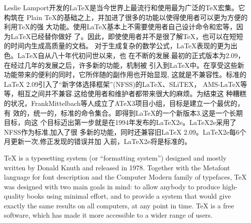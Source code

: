 \documentclass[UTF8,nofonts]{ctexart}
\begin{document}
Leslie Lamport开发的LaTeX是当今世界上最流行和使用最为广泛的TeX宏集。它构筑在
Plain TeX的基础之上，并加进了很多的功能以使得使用者可以更为方便的利用TeX的强
大功能。使用LaTeX基本上不需要使用者自己设计命令和宏等，因为LaTeX已经替你做好
了。因此，即使使用者并不是很了解TeX，也可以在短短的时间内生成高质量的文档。
对于生成复杂的数学公式，LaTeX表现的更为出色。LaTeX自从八十年代初问世以来，也
在不断的发展.最初的正式版本为2.09，在经过几年的发展之后，许多新的功能，机制被
引入到LaTeX中。在享受这些新功能带来的便利的同时，它所伴随的副作用也开始显现,
这就是不兼容性。标准的LaTeX 2.09引入了“新字体选择框架”(NFSS)的LaTeX、SLiTEX，
AMS-LaTeX等等，相互之间并不兼容.这给使用者和维护者都带来很大的麻烦。为结束这
种糟糕的状况，FrankMittelbach等人成立了ATeX3项目小组，目标是建立一个最优的，有
效的，统一的，标准的命令集合。即得到LaTeX的一个新版本3.这是一个长期目标，向这
个目标迈出第一步就是在1994年发布的LaTeX2e。LaTeX2e采用了NFSS作为标准,加入了很
多新的功能，同时还兼容旧LaTeX 2.09。LaTeX2e每6个月更新一次,修正发现的错误并加
入前，LaTeX2e将是标准的。

\noindent TeX is a typesetting system (or ``formatting system'') designed and
mostly written by Donald Knuth and released in 1978. Together with the Metafont
language for font description and the Computer Modern family of typefaces, TeX
was designed with two main goals in mind: to allow anybody to produce
high-quality books using minimal effort, and to provide a system that would
give exactly the same results on all computers, at any point in time. TeX is a
free software, which has made it more accessible to a wider range of users.
\end{document}
